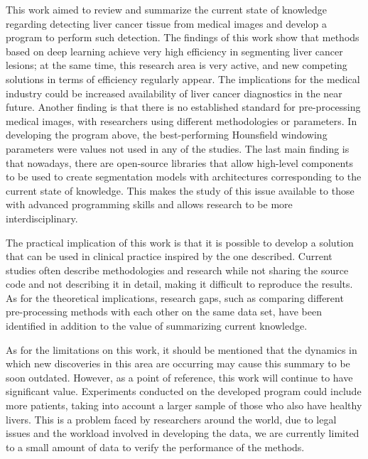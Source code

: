This work aimed to review and summarize the current state of knowledge regarding detecting liver cancer tissue from medical images and develop a program to perform such detection. The findings of this work show that methods based on deep learning achieve very high efficiency in segmenting liver cancer lesions; at the same time, this research area is very active, and new competing solutions in terms of efficiency regularly appear. The implications for the medical industry could be increased availability of liver cancer diagnostics in the near future. Another finding is that there is no established standard for pre-processing medical images, with researchers using different methodologies or parameters. In developing the program above, the best-performing Hounsfield windowing parameters were values not used in any of the studies.
The last main finding is that nowadays, there are open-source libraries that allow high-level components to be used to create segmentation models with architectures corresponding to the current state of knowledge. This makes the study of this issue available to those with advanced programming skills and allows research to be more interdisciplinary.

The practical implication of this work is that it is possible to develop a solution that can be used in clinical practice inspired by the one described. Current studies often describe methodologies and research while not sharing the source code and not describing it in detail, making it difficult to reproduce the results. As for the theoretical implications, research gaps, such as comparing different pre-processing methods with each other on the same data set, have been identified in addition to the value of summarizing current knowledge.

As for the limitations on this work, it should be mentioned that the dynamics in which new discoveries in this area are occurring may cause this summary to be soon outdated. However, as a point of reference, this work will continue to have significant value. Experiments conducted on the developed program could include more patients, taking into account a larger sample of those who also have healthy livers. This is a problem faced by researchers around the world, due to legal issues and the workload involved in developing the data, we are currently limited to a small amount of data to verify the performance of the methods.